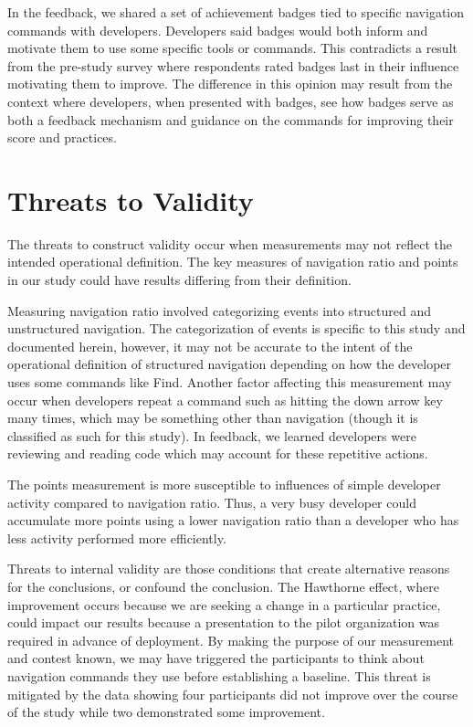 \documentclass{sig-alternate}
\begin{document}
In the feedback, we shared a set of achievement badges tied to specific navigation commands with developers.   Developers said badges would both inform and motivate them to use some specific tools or commands.   This contradicts a result from the pre-study survey where respondents rated badges last in their influence motivating them to improve.  The difference in this opinion may result from the context where developers, when presented with badges, see how badges serve as both a feedback mechanism and guidance on the commands for improving their score and practices.

\section{Threats to Validity}
The threats to construct validity occur when measurements may not reflect the intended operational definition. The key measures of navigation ratio and points in our study could have results differing from their definition.  

Measuring navigation ratio involved categorizing events into structured and unstructured navigation.  The categorization of events is specific to this study and documented herein, however, it may not be accurate to the intent of the operational definition of structured navigation depending on how the developer uses some commands like Find.  Another factor affecting this measurement may occur when developers repeat a command such as hitting the down arrow key many times, which may be something other than navigation (though it is classified as such for this study).  In feedback, we learned developers were reviewing and reading code which may account for these repetitive actions.

The points measurement is more susceptible to influences of simple developer activity compared to navigation ratio.  Thus, a very busy developer could accumulate more points using a lower navigation ratio than a developer who has less activity performed more efficiently.  

Threats to internal validity are those conditions that create alternative reasons for the conclusions, or confound the conclusion.  
The Hawthorne effect, where improvement occurs because we are seeking a change in a particular practice, could impact our results because a presentation  to the pilot organization was required in advance of deployment.  By making the purpose of our measurement and contest known,  we may have triggered the participants to think about navigation commands they use before establishing a baseline.   This threat is mitigated by the data showing four participants did not improve over the course of the study while two demonstrated some improvement.
\end{document}
